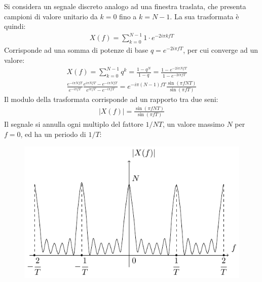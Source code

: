 \documentclass{article}
\numberwithin{equation}{subsection}
\begin{document}
Si considera un segnale discreto analogo ad una finestra traslata, che presenta campioni di valore unitario da $k=0$ fino a $k=N-1$. La sua trasformata è quindi:
\begin{gather*}
    X(f)=\displaystyle\sum_{k=0}^{N-1}1\cdot e^{-2i\pi kfT}
\end{gather*}
Corrisponde ad una somma di potenze di base $q=e^{-2i\pi fT}$, per cui converge ad un valore:
\begin{gather*}
    X(f)=\displaystyle\sum_{k=0}^{N-1}q^k=\frac{1-q^N}{1-q}=\frac{1-e^{-2i\pi NfT}}{1-e^{-2i\pi fT}}\\
    \frac{e^{-i\pi NfT}}{e^{-i\pi fT}}\frac{e^{i\pi NfT}-e^{-i\pi NfT}}{e^{i\pi fT}-e^{-i\pi fT}}=e^{-i\pi(N-1)fT}\frac{\sin(\pi fNT)}{\sin(\pi fT)}
\end{gather*}
Il modulo della trasformata corrisponde ad un rapporto tra due seni:
\begin{gather*}
    |X(f)|=\displaystyle\frac{\sin(\pi fNT)}{\sin(\pi fT)}
\end{gather*}
Il segnale si annulla ogni multiplo del fattore $1/NT$, un valore massimo $N$ per $f=0$, ed ha un periodo di $1/T$:
\begin{figure}[H]%
    \centering
    \includegraphics{trasformata-discreta-1.pdf}%
\end{figure}
\end{document}
